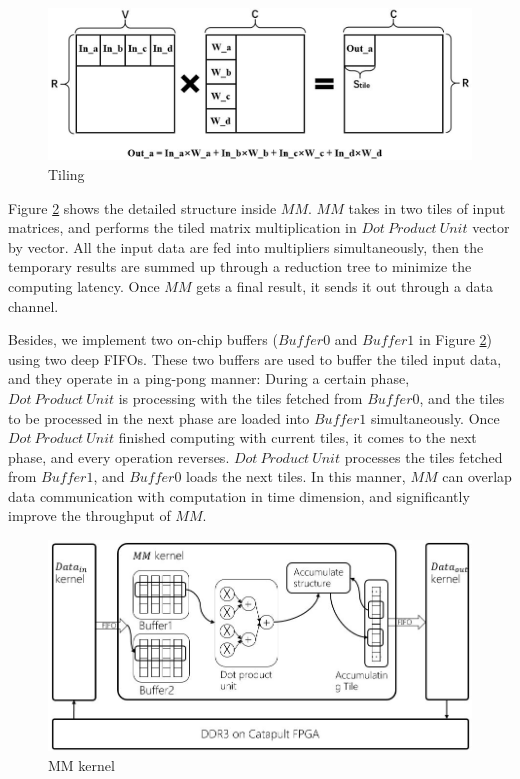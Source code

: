 \documentclass{acm_proc_article-sp-copy}
\begin{document}
\begin{figure}[h]
	\centering
	\includegraphics[width=1.0\linewidth]{figure/tile.jpg}
	\caption{Tiling}
	\label{tile}
\end{figure}

Figure \ref{mm} shows the detailed structure inside $MM$. $MM$ takes in two tiles of input matrices, and performs the tiled matrix multiplication in $Dot\ Product\ Unit$ vector by vector. All the input data are fed into multipliers simultaneously, then the temporary results are summed up through a reduction tree to minimize the computing latency. Once $MM$ gets a final result, it sends it out through a data channel.  

Besides, we implement two on-chip buffers ($Buffer0$ and $Buffer1$ in Figure \ref{mm}) using two deep FIFOs. These two buffers are used to buffer the tiled input data, and they operate in a ping-pong manner: During a certain phase, $Dot\ Product\ Unit$ is processing with the tiles fetched from $Buffer0$, and the tiles to be processed in the next phase are loaded into $Buffer1$ simultaneously. Once $Dot\ Product\ Unit$ finished computing with current tiles, it comes to the next phase, and every operation reverses. $Dot\ Product\ Unit$ processes the tiles fetched from $Buffer1$, and $Buffer0$ loads the next tiles. In this manner, $MM$ can overlap data communication with computation in time dimension, and significantly improve the throughput of $MM$.

\begin{figure}
	\centering
	\includegraphics[width=1.0\linewidth]{./figure/tree.jpg}
	\caption{MM kernel}
	\label{mm}
\end{figure}
\end{document}
